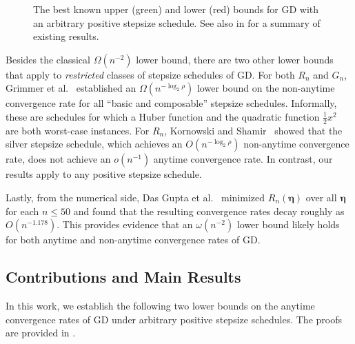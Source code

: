 \documentclass[11pt]{article}
\newcommand{\schedule}{\bm{\eta}}
\begin{document}
\begin{figure}[t]
\caption{The best known upper (green) and lower (red) bounds for GD with an arbitrary positive stepsize schedule.
See also  in  for a summary of existing results.}
\label{fig:sota_results}
\end{figure}



Besides the classical $\Omega(n^{-2})$ lower bound, there are two other lower bounds that apply to \emph{restricted} classes of stepsize schedules of GD.
For both $R_n$ and $G_n$, Grimmer et al.~\cite{grimmer:2025a} established an $\Omega(n^{-\log_2\rho})$ lower bound on the non-anytime convergence rate for all ``basic and composable'' stepsize schedules.
Informally, these are schedules for which a Huber function and the quadratic function $\frac{1}{2}x^2$ are both worst-case instances.
For $R_n$, Kornowski and Shamir~\cite{kornowski:2024} showed that the silver stepsize schedule, which achieves an $O(n^{-\log_2\rho})$ non-anytime convergence rate, does not achieve an $o(n^{-1})$ anytime convergence rate.
In contrast, our results apply to any positive stepsize schedule.


Lastly, from the numerical side, Das Gupta et al.~\cite{das-gupta:2024} minimized $R_n(\schedule)$ over all $\schedule$ for each $n\leq 50$ and found that the resulting convergence rates decay roughly as $O(n^{-1.178})$.
This provides evidence that an $\omega(n^{-2})$ lower bound likely holds for both anytime and non-anytime convergence rates of GD.


\subsection{Contributions and Main Results}
In this work, we establish the following two lower bounds on the anytime convergence rates of GD under arbitrary positive stepsize schedules.
The proofs are provided in .
\end{document}
